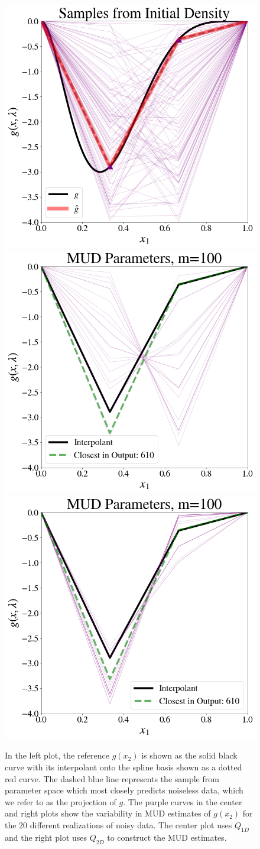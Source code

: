 \begin{frame}[t]
\begin{figure}[htbp]
\centering
    \includegraphics[width=0.325\linewidth]{figures/pde-highd/pde-highd_init_D2.png}
    \includegraphics[width=0.325\linewidth]{figures/pde-highd/pde-highd_pair_D2-1_m100.png}
    \includegraphics[width=0.325\linewidth]{figures/pde-highd/pde-highd_pair_D2-2_m100.png}
\caption{
In the left plot, the reference $g(x_2)$ is shown as the solid black curve with its interpolant onto the spline basis shown as a dotted red curve.
The dashed blue line represents the sample from parameter space which most closely predicts noiseless data, which we refer to as the projection of $g$.
The purple curves in the center and right plots show the variability in MUD estimates of $g(x_2)$ for the 20 different realizations of noisy data.
The center plot uses $Q_{1D}$ and the right plot uses $Q_{2D}$ to construct the MUD estimates.
}
\label{fig:pde-MUD}
\end{figure}
\end{frame}

